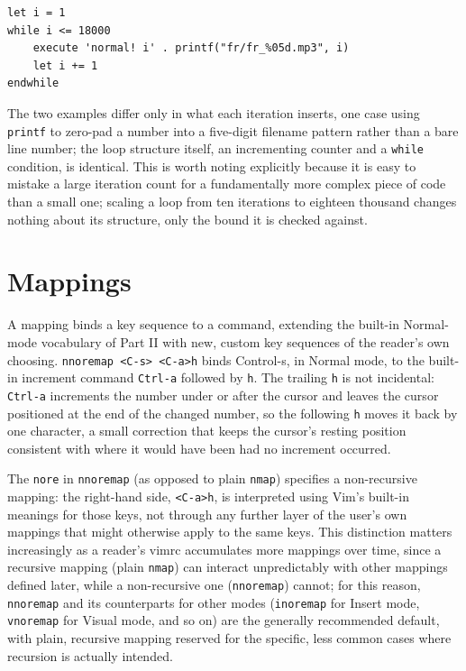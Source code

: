 \begin{lstlisting}
let i = 1
while i <= 18000
    execute 'normal! i' . printf("fr/fr_%05d.mp3", i)
    let i += 1
endwhile
\end{lstlisting}

The two examples differ only in what each iteration inserts, one case using \texttt{printf} to zero-pad a number into a five-digit filename pattern rather than a bare line number; the loop structure itself, an incrementing counter and a \texttt{while} condition, is identical. This is worth noting explicitly because it is easy to mistake a large iteration count for a fundamentally more complex piece of code than a small one; scaling a loop from ten iterations to eighteen thousand changes nothing about its structure, only the bound it is checked against.

\section{Mappings}

A mapping binds a key sequence to a command, extending the built-in Normal-mode vocabulary of Part II with new, custom key sequences of the reader's own choosing. \texttt{nnoremap <C-s> <C-a>h} binds Control-s, in Normal mode, to the built-in increment command \texttt{Ctrl-a} followed by \texttt{h}. The trailing \texttt{h} is not incidental: \texttt{Ctrl-a} increments the number under or after the cursor and leaves the cursor positioned at the end of the changed number, so the following \texttt{h} moves it back by one character, a small correction that keeps the cursor's resting position consistent with where it would have been had no increment occurred.

The \texttt{nore} in \texttt{nnoremap} (as opposed to plain \texttt{nmap}) specifies a non-recursive mapping: the right-hand side, \texttt{<C-a>h}, is interpreted using Vim's built-in meanings for those keys, not through any further layer of the user's own mappings that might otherwise apply to the same keys. This distinction matters increasingly as a reader's vimrc accumulates more mappings over time, since a recursive mapping (plain \texttt{nmap}) can interact unpredictably with other mappings defined later, while a non-recursive one (\texttt{nnoremap}) cannot; for this reason, \texttt{nnoremap} and its counterparts for other modes (\texttt{inoremap} for Insert mode, \texttt{vnoremap} for Visual mode, and so on) are the generally recommended default, with plain, recursive mapping reserved for the specific, less common cases where recursion is actually intended.

